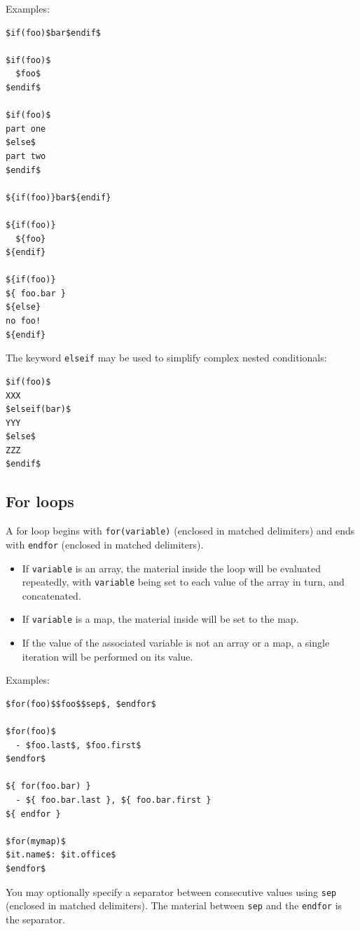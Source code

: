 \documentclass[
  b5paper
]{book}
\providecommand{\tightlist}{%
  \setlength{\itemsep}{0pt}\setlength{\parskip}{0pt}}
\begin{document}
Examples:

\begin{verbatim}
$if(foo)$bar$endif$

$if(foo)$
  $foo$
$endif$

$if(foo)$
part one
$else$
part two
$endif$

${if(foo)}bar${endif}

${if(foo)}
  ${foo}
${endif}

${if(foo)}
${ foo.bar }
${else}
no foo!
${endif}
\end{verbatim}

The keyword \texttt{elseif} may be used to simplify complex nested
conditionals:

\begin{verbatim}
$if(foo)$
XXX
$elseif(bar)$
YYY
$else$
ZZZ
$endif$
\end{verbatim}

\subsection{For loops}\label{for-loops}

A for loop begins with \texttt{for(variable)} (enclosed in matched
delimiters) and ends with \texttt{endfor} (enclosed in matched
delimiters).

\begin{itemize}
\tightlist
\item
  If \texttt{variable} is an array, the material inside the loop will be
  evaluated repeatedly, with \texttt{variable} being set to each value
  of the array in turn, and concatenated.
\item
  If \texttt{variable} is a map, the material inside will be set to the
  map.
\item
  If the value of the associated variable is not an array or a map, a
  single iteration will be performed on its value.
\end{itemize}

Examples:

\begin{verbatim}
$for(foo)$$foo$$sep$, $endfor$

$for(foo)$
  - $foo.last$, $foo.first$
$endfor$

${ for(foo.bar) }
  - ${ foo.bar.last }, ${ foo.bar.first }
${ endfor }

$for(mymap)$
$it.name$: $it.office$
$endfor$
\end{verbatim}

You may optionally specify a separator between consecutive values using
\texttt{sep} (enclosed in matched delimiters). The material between
\texttt{sep} and the \texttt{endfor} is the separator.
\end{document}
